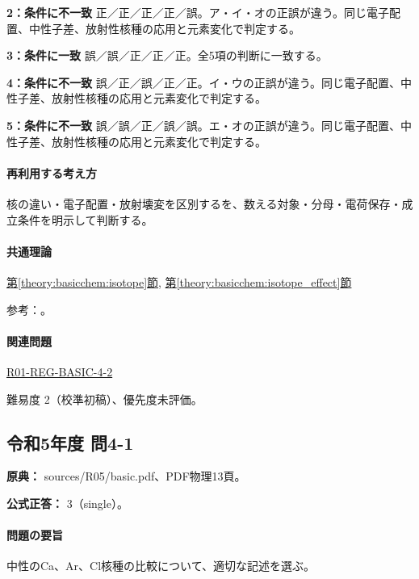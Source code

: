 \noindent\textbf{2：条件に不一致} 正／正／正／正／誤。ア・イ・オの正誤が違う。同じ電子配置、中性子差、放射性核種の応用と元素変化で判定する。\par

\noindent\textbf{3：条件に一致} 誤／誤／正／正／正。全5項の判断に一致する。\par

\noindent\textbf{4：条件に不一致} 誤／正／誤／正／正。イ・ウの正誤が違う。同じ電子配置、中性子差、放射性核種の応用と元素変化で判定する。\par

\noindent\textbf{5：条件に不一致} 誤／誤／正／誤／誤。エ・オの正誤が違う。同じ電子配置、中性子差、放射性核種の応用と元素変化で判定する。\par

\paragraph{再利用する考え方} 核の違い・電子配置・放射壊変を区別するを、数える対象・分母・電荷保存・成立条件を明示して判断する。

\paragraph{共通理論} \hyperref[theory:basicchem:isotope]{第\ref*{theory:basicchem:isotope}節}, \hyperref[theory:basicchem:isotope_effect]{第\ref*{theory:basicchem:isotope_effect}節}

\par 参考：\cite{iupac_isotopes,iupac_isotope_effect}。

\paragraph{関連問題} \hyperref[q:r01-reg-basic-4-2]{R01-REG-BASIC-4-2}

\par 難易度 2（校準初稿）、優先度未評価。

\subsection{令和5年度 問4-1}
\label{q:r05-reg-basic-4-1}

\noindent\textbf{原典：} sources/R05/basic.pdf、PDF物理13頁。

\textbf{公式正答：} 3（single）。

\paragraph{問題の要旨} 中性のCa、Ar、Cl核種の比較について、適切な記述を選ぶ。

